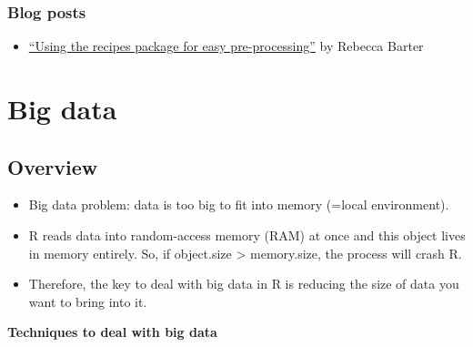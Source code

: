 \documentclass[
]{book}
\providecommand{\tightlist}{%
  \setlength{\itemsep}{0pt}\setlength{\parskip}{0pt}}
\begin{document}
\hypertarget{blog-posts}{%
\subsection{Blog posts}\label{blog-posts}}

\begin{itemize}
\tightlist
\item
  \href{http://www.rebeccabarter.com/blog/2019-06-06_pre_processing/}{``Using the recipes package for easy pre-processing''} by Rebecca Barter
\end{itemize}

\hypertarget{big_data}{%
\chapter{Big data}\label{big_data}}

\hypertarget{overview-2}{%
\section{Overview}\label{overview-2}}

\begin{itemize}
\tightlist
\item
  Big data problem: data is too big to fit into memory (=local environment).
\item
  R reads data into random-access memory (RAM) at once and this object lives in memory entirely. So, if object.size \textgreater{} memory.size, the process will crash R.
\item
  Therefore, the key to deal with big data in R is reducing the size of data you want to bring into it.
\end{itemize}

\textbf{Techniques to deal with big data}
\end{document}
